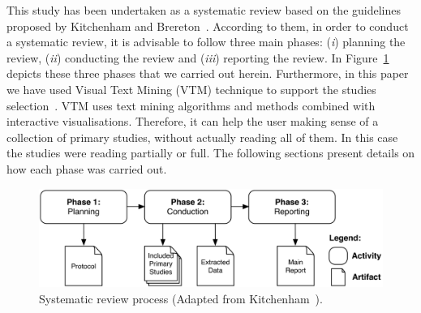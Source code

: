 This study has been undertaken as a systematic review based on the guidelines proposed by Kitchenham and Brereton~\cite{Kitchenham}. According to them, in order to conduct a systematic review, it is advisable to follow three main phases: (\textit{i}) planning the review, (\textit{ii}) conducting the review and (\textit{iii}) reporting the review. In Figure~\ref{process_systematic_review} depicts these three phases that we carried out herein. Furthermore, in this paper we have used Visual Text Mining (VTM) technique to support the studies selection~\cite{Malheiros:2007}. VTM uses text mining algorithms and methods combined with interactive visualisations. Therefore, it can help the user making sense of a collection of primary studies, without actually reading all of them. In this case the studies were reading partially or full. The following sections present details on how each phase was carried out.

\begin{figure}[!h]
\centering
  \includegraphics[scale=0.09]{figuras/process}
\caption{Systematic review process (Adapted from Kitchenham~\cite{Kitchenham}).}
\label{process_systematic_review}
\end{figure} 